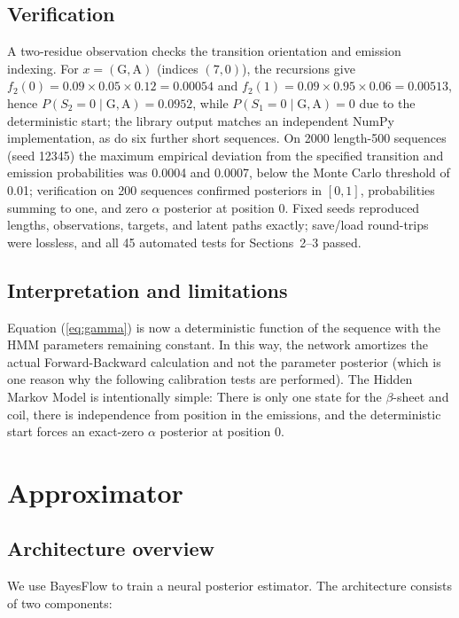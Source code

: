\documentclass[12pt]{article}
\begin{document}
\subsection{Verification}

A two-residue observation checks the transition orientation and emission
indexing. For $x=(\mathrm{G},\mathrm{A})$ (indices $(7,0)$), the
recursions give $f_2(0)=0.09\times0.05\times0.12=0.00054$
and $f_2(1)=0.09\times0.95\times0.06=0.00513$, hence
$P(S_2{=}0\mid\mathrm{G,A})=0.0952$, while
$P(S_1{=}0\mid\mathrm{G,A})=0$ due to the deterministic start; the library
output matches an independent NumPy implementation, as do six further short
sequences. On 2000 length-500 sequences (seed 12345) the
maximum empirical deviation from the specified transition and emission
probabilities was 0.0004 and 0.0007, below the Monte Carlo threshold of 0.01;
verification on 200 sequences confirmed posteriors in $[0,1]$, probabilities
summing to one, and zero $\alpha$ posterior at position 0. Fixed seeds reproduced
lengths, observations, targets, and latent paths exactly; save/load round-trips
were lossless, and all 45 automated tests for Sections~2--3 passed.

\subsection{Interpretation and limitations}

Equation (\ref{eq:gamma}) is now a deterministic function of the sequence with the HMM parameters remaining constant. In this way, the network amortizes the actual Forward-Backward calculation and not the parameter posterior (which is one reason why the following calibration tests are performed). The Hidden Markov Model is intentionally simple: There is only one state for the $\beta$-sheet and coil, there is independence from position in the emissions, and the deterministic start
forces an exact-zero $\alpha$ posterior at position 0.

\section{Approximator}
\label{sec:approx}

\subsection{Architecture overview}

We use BayesFlow \parencite{bayesflow} to train a neural posterior estimator. The
architecture consists of two components:
\end{document}
